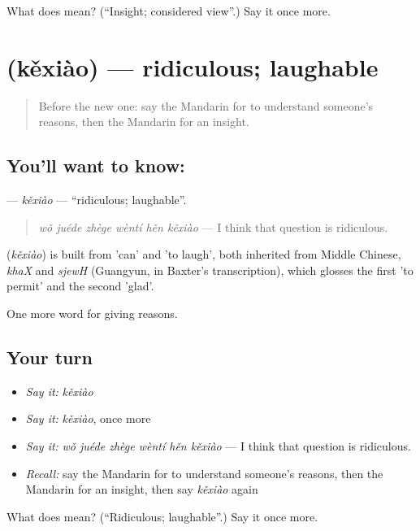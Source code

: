 \begin{tcolorbox}[breakable,colback=teal!4,colframe=teal!35!black,title={Before you move on}]
What does  mean? (\textquotedblleft{}Insight; considered view\textquotedblright{}.) Say it once more.
\end{tcolorbox}
\section[\texorpdfstring{\zh{可笑} (kěxiào)}{可笑 (kěxiào)}]{ (kěxiào) — ridiculous; laughable}

\label{lesson:ZH-C367-kexiao}



\begin{quote}
Before the new one: say the Mandarin for to understand someone's reasons, then the Mandarin for an insight.
\end{quote}

\subsection*{You'll want to know: }
\textbf{} — \emph{kěxiào} — \textquotedblleft{}ridiculous; laughable\textquotedblright{}.

\begin{quote}
\textbf{} \emph{wǒ juéde zhège wèntí hěn kěxiào} — I think that question is ridiculous.
\end{quote}

\begin{cousinweb}
\textbf{} (\emph{kěxiào}) is built from  'can' and  'to laugh', both inherited from Middle Chinese, \emph{khaX} and \emph{sjewH} (Guangyun, in Baxter's transcription), which glosses the first 'to permit' and the second 'glad'.
\end{cousinweb}

\begin{grammarlens}[title={What you've built}]
One more word for giving reasons.
\end{grammarlens}

\subsection*{Your turn}
\begin{itemize}
\raggedright
  \item \emph{Say it:} \emph{kěxiào}
  \item \emph{Say it:} \emph{kěxiào}, once more
  \item \emph{Say it:} \emph{wǒ juéde zhège wèntí hěn kěxiào} — I think that question is ridiculous.
  \item \emph{Recall:} say the Mandarin for to understand someone's reasons, then the Mandarin for an insight, then say \emph{kěxiào} again
\end{itemize}

\begin{tcolorbox}[breakable,colback=teal!4,colframe=teal!35!black,title={Before you move on}]
What does  mean? (\textquotedblleft{}Ridiculous; laughable\textquotedblright{}.) Say it once more.
\end{tcolorbox}
